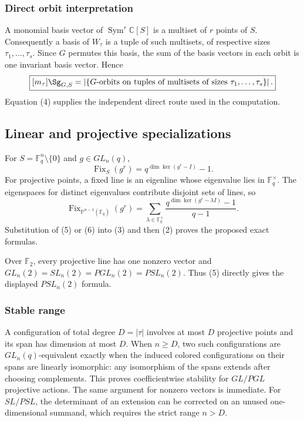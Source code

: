 \documentclass[10pt]{article}
\newcommand{\Sym}{\operatorname{Sym}}
\newcommand{\Fix}{\operatorname{Fix}}
\newcommand{\F}{\mathbb F}
\begin{document}
\subsubsection*{Direct orbit interpretation}
A monomial basis vector of $\Sym^r\mathbb C[S]$ is a multiset of $r$ points
of $S$.  Consequently a basis of $W_\tau$ is a tuple of such multisets, of
respective sizes $\tau_1,\ldots,\tau_s$.  Since $G$ permutes this basis, the
sum of the basis vectors in each orbit is one invariant basis vector.  Hence
\begin{equation}
 \boxed{[m_\tau]\Sg_{G,S}=\left|\{G\text{-orbits on tuples of multisets of
 sizes }\tau_1,\ldots,\tau_s\}\right|.}
\end{equation}
Equation (4) supplies the independent direct route used in the computation.

\subsection{Linear and projective specializations}
For $S=\F_q^n\setminus\{0\}$ and $g\in GL_n(q)$,
\begin{equation}
 \Fix_S(g^r)=q^{\dim\ker(g^r-I)}-1.
\end{equation}
For projective points, a fixed line is an eigenline whose eigenvalue lies in
$\F_q^\times$.  The eigenspaces for distinct eigenvalues contribute disjoint
sets of lines, so
\begin{equation}
 \Fix_{\mathbb P^{n-1}(\F_q)}(g^r)=
 \sum_{\lambda\in\F_q^\times}
 \frac{q^{\dim\ker(g^r-\lambda I)}-1}{q-1}.
\end{equation}
Substitution of (5) or (6) into (3) and then (2) proves the proposed exact
formulas.

Over $\F_2$, every projective line has one nonzero vector and
$GL_n(2)=SL_n(2)=PGL_n(2)=PSL_n(2)$.  Thus (5) directly gives the displayed
$PSL_n(2)$ formula.

\subsubsection*{Stable range}
A configuration of total degree $D=|\tau|$ involves at most $D$ projective
points and its span has dimension at most $D$.  When $n\geq D$, two such
configurations are $GL_n(q)$-equivalent exactly when the induced colored
configurations on their spans are linearly isomorphic: any isomorphism of the
spans extends after choosing complements.  This proves coefficientwise
stability for $GL/PGL$ projective actions.  The same argument for nonzero
vectors is immediate.  For $SL/PSL$, the determinant of an extension can be
corrected on an unused one-dimensional summand, which requires the strict
range $n>D$.
\end{document}
